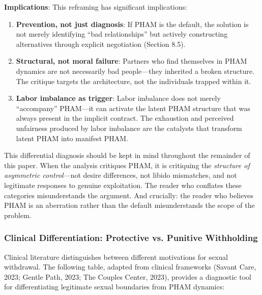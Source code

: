 \documentclass[12pt, letterpaper]{article}
\begin{document}
\textbf{Implications}: This reframing has significant implications:

\begin{enumerate}
    \item \textbf{Prevention, not just diagnosis}: If PHAM is the default, the solution is not merely identifying ``bad relationships'' but actively constructing alternatives through explicit negotiation (Section 8.5).
    
    \item \textbf{Structural, not moral failure}: Partners who find themselves in PHAM dynamics are not necessarily bad people---they inherited a broken structure. The critique targets the architecture, not the individuals trapped within it.
    
    \item \textbf{Labor imbalance as trigger}: Labor imbalance does not merely ``accompany'' PHAM---it can activate the latent PHAM structure that was always present in the implicit contract. The exhaustion and perceived unfairness produced by labor imbalance are the catalysts that transform latent PHAM into manifest PHAM.
\end{enumerate}

This differential diagnosis should be kept in mind throughout the remainder of this paper. When the analysis critiques PHAM, it is critiquing the \textit{structure of asymmetric control}---not desire differences, not libido mismatches, and not legitimate responses to genuine exploitation. The reader who conflates these categories misunderstands the argument. And crucially: the reader who believes PHAM is an aberration rather than the default misunderstands the scope of the problem.

\subsubsection{Clinical Differentiation: Protective vs. Punitive Withholding}

Clinical literature distinguishes between different motivations for sexual withdrawal. The following table, adapted from clinical frameworks (Savant Care, 2023; Gentle Path, 2023; The Couples Center, 2023), provides a diagnostic tool for differentiating legitimate sexual boundaries from PHAM dynamics:
\end{document}
